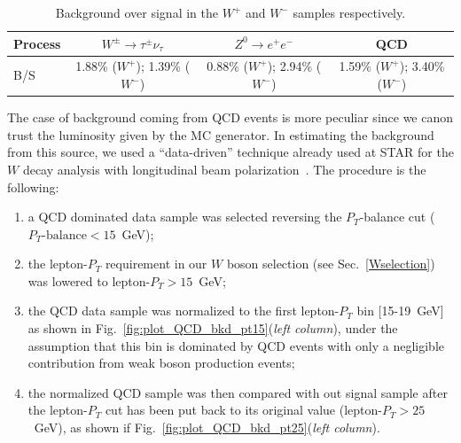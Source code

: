 \documentclass[12pt]{article}
\begin{document}
\begin{table}[htbp]
\centering
\begin{tabular}{| l | c | c  |  c |}
\hline
Process & $W^{\pm}\rightarrow \tau^{\pm} \nu_{\tau}$ & $Z^{0} \rightarrow e^{+}e^{-}$ & QCD \\
\hline
B/S & 1.88\% ($W^{+}$); 1.39\% ($W^{-}$)&  0.88\% ($W^{+}$); 2.94\% ($W^{-}$)& 1.59\% ($W^{+}$); 3.40\% ($W^{-}$)\\
\hline
\end{tabular}
\caption{Background over signal in the $W^{+}$ and $W^{-}$ samples respectively.}
\label{Tab:BoS}
\end{table}

The case of background coming from QCD events is more peculiar since we canon trust the luminosity given by the MC generator. In estimating the background from this source, we used a ``data-driven'' technique already used at STAR for the $W$ decay analysis with longitudinal beam polarization~\cite{STAR:Wlong}. The procedure is the following:

\begin{enumerate}
   \item a QCD dominated data sample was selected reversing the $P_{T}$-balance cut ($P_{T}\text{-balance} < 15$~GeV);
   \item the lepton-$P_{T}$ requirement in our $W$ boson selection (see Sec.~\ref{Wselection}) was lowered to  lepton-$P_{T} > 15$~GeV;
   \item the QCD data sample was normalized to the first lepton-$P_{T}$ bin [15-19~GeV] as shown in Fig.~\ref{fig:plot_QCD_bkd_pt15}({\it left column}), under the assumption that this bin is dominated by QCD events with only a negligible contribution from weak boson production events;
   \item the normalized QCD sample was then compared with out signal sample after the lepton-$P_{T}$ cut has been put back to its original value (lepton-$P_{T} > 25$~GeV), as shown if Fig.~\ref{fig:plot_QCD_bkd_pt25}({\it left column}). 
\end{enumerate}
\end{document}
